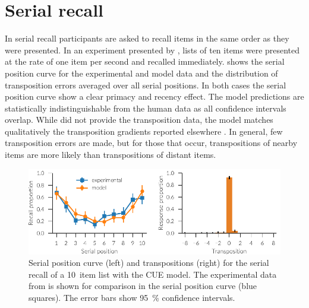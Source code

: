 \section{Serial recall}
In serial recall participants are asked to recall items in the same order as they were presented.
In an experiment presented by \textcite{Jahnke1968}, lists of ten items were presented at the rate of one item per second and recalled immediately.
 shows the serial position curve for the experimental and model data and the distribution of transposition errors averaged over all serial positions.
In both cases the serial position curve show a clear primacy and recency effect.
The model predictions are statistically indistinguishable from the human data as all confidence intervals overlap.
While \textcite{Jahnke1968} did not provide the transposition data, the model matches qualitatively the transposition gradients reported elsewhere \parencite{Henson1996}.
In general, few transposition errors are made, but for those that occur, transpositions of nearby items are more likely than transpositions of distant items.
\begin{figure}
    \centering
    \includegraphics{figures/results/serial}
    \caption[Serial position curve and transpositions for serial recall with the CUE model]{Serial position curve (left) and transpositions (right) for the serial recall of a \num{10}~item list with the CUE model. The experimental data from \textcite{Jahnke1968} is shown for comparison in the serial position curve (blue squares). The error bars show \SI{95}{\percent} confidence intervals.}\label{fig:results-serial}
\end{figure}

